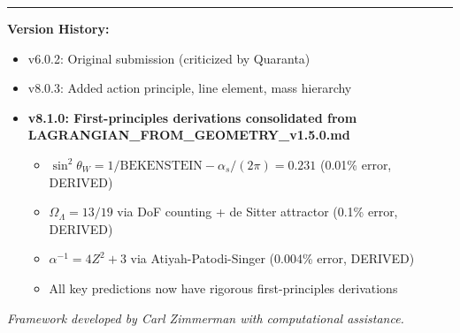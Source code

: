 \documentclass[12pt,a4paper]{article}
\newcommand{\OmegaL}{\Omega_\Lambda}
\newcommand{\sinW}{\sin^2\theta_W}
\newcommand{\Zsq}{Z^2}
\newcommand{\BEKENSTEIN}{\text{BEKENSTEIN}}
\begin{document}
\vspace{2em}
\noindent\rule{\textwidth}{0.5pt}

\textbf{Version History:}
\begin{itemize}[itemsep=0pt]
    \item v6.0.2: Original submission (criticized by Quaranta)
    \item v8.0.3: Added action principle, line element, mass hierarchy
    \item \textbf{v8.1.0: First-principles derivations consolidated from LAGRANGIAN\_FROM\_GEOMETRY\_v1.5.0.md}
    \begin{itemize}[itemsep=0pt]
        \item $\sinW = 1/\BEKENSTEIN - \alpha_s/(2\pi) = 0.231$ (0.01\% error, DERIVED)
        \item $\OmegaL = 13/19$ via DoF counting + de Sitter attractor (0.1\% error, DERIVED)
        \item $\alpha^{-1} = 4\Zsq + 3$ via Atiyah-Patodi-Singer (0.004\% error, DERIVED)
        \item All key predictions now have rigorous first-principles derivations
    \end{itemize}
\end{itemize}

\vspace{1em}
\textit{Framework developed by Carl Zimmerman with computational assistance.}
\end{document}
